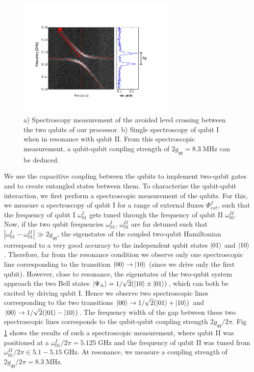 \begin{figure}[ht!]
	\centering
		\includegraphics[width=0.7\textwidth]{"./data/ct5/2011_04_11 - anticrossing/qubit_anticrossing_modified"}
	\caption[Spectroscopic measurement of the avoided level crossing between the two qubits of our processor]{a) Spectroscopy measurement of the avoided level crossing between the two qubits of our processor. b) Single spectroscopy of qubit I when in resonance with qubit II. From this spectroscopic measurement, a qubit-qubit coupling strength of $2g_{qq}=8.3\;\mathrm{MHz}$ can be deduced. }
	\label{fig:qubit_anticrossing}
\end{figure}

We use the capacitive coupling between the qubits to implement two-qubit gates and to create entangled states between them. To characterize the qubit-qubit interaction, we first perform a spectroscopic measurement of the qubits. For this, we measure a spectroscopy of qubit I for a range of external fluxes $\Phi_{ext}^I$, such that the frequency of qubit I $\omega_{01}^I$ gets tuned through the frequency of qubit II $\omega_{01}^{II}$. Now, if the two qubit frequencies $\omega_{01}^I$, $\omega_{01}^{II}$ are far detuned such that $|\omega_{01}^I-\omega_{01}^{II}|\gg 2g_{qq}$, the eigenstates of the coupled two-qubit Hamiltonian correspond to a very good accuracy to the independent qubit states $\left| 01 \right>$ and $\left| 10 \right>$. Therefore, far from the resonance condition we observe only one spectroscopic line corresponding to the transition $\left| 00 \right>\to\left| 10 \right>$ (since we drive only the first qubit). However, close to resonance, the eigenstates of the two-qubit system approach the two Bell states $\left| \Psi_\pm \right> = 1/\sqrt{2}(\left| 10 \right>\pm\left| 01 \right>)$, which can both be excited by driving qubit I. Hence we observe two spectroscopic lines corresponding to the two transitions $\left| 00 \right>\to 1/\sqrt{2}(\left| 01 \right>+\left| 10 \right>)$ and $\left| 00 \right>\to 1/\sqrt{2}(\left| 01 \right>-\left| 10 \right>)$. The frequency width of the gap between these two spectroscopic lines corresponds to the qubit-qubit coupling strength $2g_{qq}/2\pi$. Fig \ref{fig:qubit_anticrossing} shows the results of such a spectroscopic measurement, where qubit II was positioned at a $\omega_{01}^I/2\pi = 5.125\;\mathrm{GHz}$ and the frequency of qubit II was tuned from $\omega_{01}^{II}/2\pi\in 5.1-5.15\;\mathrm{GHz}$. At resonance, we measure a coupling strength of $2g_{qq}/2\pi = 8.3\;\mathrm{MHz}$.

